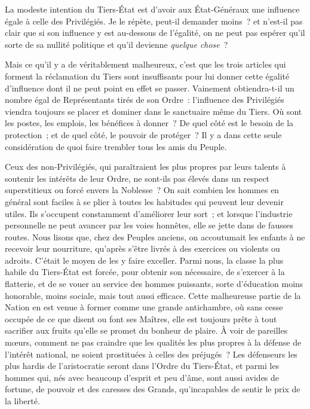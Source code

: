\documentclass[french,twoside]{book} %
\begin{document}
La modeste intention du Tiers-État est d’avoir aux État-Généraux une influence égale à celle des Privilégiés. Je le répète, peut-il demander moins ? et n’est-il pas clair que si son influence y est au-dessous de l’égalité, on ne peut pas espérer qu’il sorte de sa nullité politique et qu’il devienne {\itshape quelque chose} ?\par
Mais ce qu’il y a de véritablement malheureux, c’est que les trois articles qui forment la réclamation du Tiers sont insuffisants pour lui donner cette égalité d’influence dont il ne peut point en effet se passer. Vainement obtiendra-t-il un nombre égal de Représentants tirés de son Ordre : l’influence des Privilégiés viendra toujours se placer et dominer dans le sanctuaire même du Tiers. Où sont les postes, les emplois, les bénéfices à donner ? De quel côté est le besoin de la protection ; et de quel côté, le pouvoir de protéger ? Il y a dans cette seule considération de quoi faire trembler tous les amis du Peuple.\par
Ceux des non-Privilégiés, qui paraîtraient les plus propres par leurs talents à soutenir les intérêts de leur Ordre, ne sont-ils pas élevés dans un respect superstitieux ou forcé envers la Noblesse ? On sait combien les hommes en général sont faciles à se plier à toutes les habitudes qui peuvent leur devenir utiles. Ils s’occupent constamment d’améliorer leur sort ; et lorsque l’industrie personnelle ne peut avancer par les voies honnêtes, elle se jette dans de fausses routes. Nous lisons que, chez des Peuples anciens, on accoutumait les enfants à ne recevoir leur nourriture, qu’après s’être livrés à des exercices ou violents ou adroits. C’était le moyen de les y faire exceller. Parmi nous, la classe la plus habile du Tiers-État est forcée, pour obtenir son nécessaire, de s’exercer à la flatterie, et de se vouer au service des hommes puissants, sorte d’éducation moins honorable, moins sociale, mais tout aussi efficace. Cette malheureuse partie de la Nation en est venue à former comme une grande antichambre, où sans cesse occupée de ce que disent ou font ses Maîtres, elle est toujours prête à tout sacrifier aux fruits qu’elle se promet du bonheur de plaire. À voir de pareilles mœurs, comment ne pas craindre que les qualités les plus propres à la défense de l’intérêt national, ne soient prostituées à celles des préjugés ? Les défenseurs les plus hardis de l’aristocratie seront dans l’Ordre du Tiers-État, et parmi les hommes qui, nés avec beaucoup d’esprit et peu d’âme, sont aussi avides de fortune, de pouvoir et des caresses des Grands, qu’incapables de sentir le prix de la liberté.\par
\end{document}
